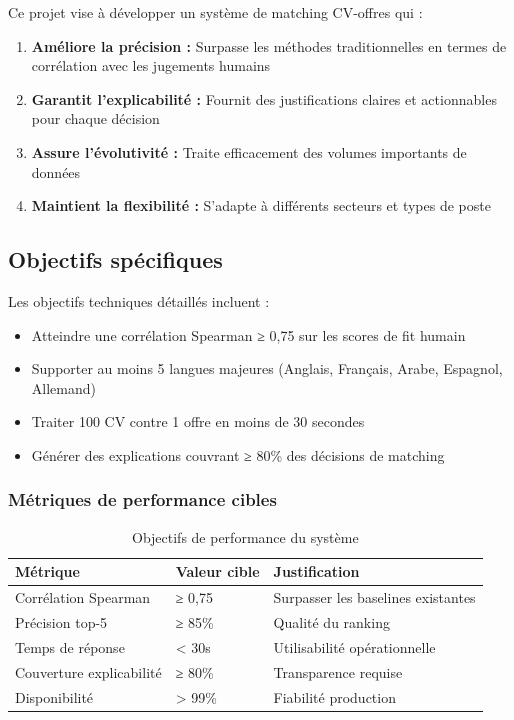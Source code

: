 \documentclass[12pt,a4paper]{report}
\begin{document}
Ce projet vise à développer un système de matching CV-offres qui :
\begin{enumerate}
\item \textbf{Améliore la précision :} Surpasse les méthodes traditionnelles en termes de corrélation avec les jugements humains
\item \textbf{Garantit l'explicabilité :} Fournit des justifications claires et actionnables pour chaque décision
\item \textbf{Assure l'évolutivité :} Traite efficacement des volumes importants de données
\item \textbf{Maintient la flexibilité :} S'adapte à différents secteurs et types de poste
\end{enumerate}

\subsection{Objectifs spécifiques}

Les objectifs techniques détaillés incluent :
\begin{itemize}
\item Atteindre une corrélation Spearman ≥ 0,75 sur les scores de fit humain
\item Supporter au moins 5 langues majeures (Anglais, Français, Arabe, Espagnol, Allemand)
\item Traiter 100 CV contre 1 offre en moins de 30 secondes
\item Générer des explications couvrant ≥ 80\% des décisions de matching
\end{itemize}

\subsubsection{Métriques de performance cibles}

\begin{table}[H]
\centering
\caption{Objectifs de performance du système}
\label{tab:objectifs_performance}
\begin{tabular}{@{}lll@{}}
\toprule
Métrique & Valeur cible & Justification \\
\midrule
Corrélation Spearman & ≥ 0,75 & Surpasser les baselines existantes \\
Précision top-5 & ≥ 85\% & Qualité du ranking \\
Temps de réponse & < 30s & Utilisabilité opérationnelle \\
Couverture explicabilité & ≥ 80\% & Transparence requise \\
Disponibilité & > 99\% & Fiabilité production \\
\bottomrule
\end{tabular}
\end{table}
\end{document}
